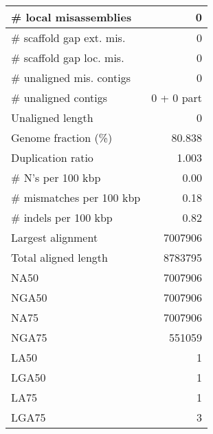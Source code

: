 \documentclass[12pt,a4paper]{article}
\begin{document}
\begin{table}[ht]
\begin{center}
\begin{tabular}{|l*{1}{|r}|}
\# local misassemblies & 0 \\ \hline
\# scaffold gap ext. mis. & 0 \\ \hline
\# scaffold gap loc. mis. & 0 \\ \hline
\# unaligned mis. contigs & 0 \\ \hline
\# unaligned contigs & 0 + 0 part \\ \hline
Unaligned length & 0 \\ \hline
Genome fraction (\%) & 80.838 \\ \hline
Duplication ratio & 1.003 \\ \hline
\# N's per 100 kbp & 0.00 \\ \hline
\# mismatches per 100 kbp & 0.18 \\ \hline
\# indels per 100 kbp & 0.82 \\ \hline
Largest alignment & 7007906 \\ \hline
Total aligned length & 8783795 \\ \hline
NA50 & 7007906 \\ \hline
NGA50 & 7007906 \\ \hline
NA75 & 7007906 \\ \hline
NGA75 & 551059 \\ \hline
LA50 & 1 \\ \hline
LGA50 & 1 \\ \hline
LA75 & 1 \\ \hline
LGA75 & 3 \\ \hline
\end{tabular}
\end{center}
\end{table}
\end{document}
